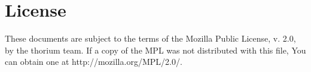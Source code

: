 \section{License}
These documents are subject to the terms of the Mozilla Public
License, v. 2.0, by the thorium team. If a copy of the MPL was not distributed with this
file, You can obtain one at http://mozilla.org/MPL/2.0/.

